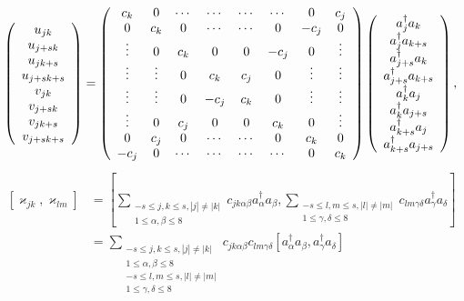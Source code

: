 \documentclass[aps,preprint]{revtex4}%
\begin{document}
\begin{equation}
\left(
\begin{array}
[c]{c}%
u_{jk}\\
u_{j+sk}\\
u_{jk+s}\\
u_{j+sk+s}\\
v_{jk}\\
v_{j+sk}\\
v_{jk+s}\\
v_{j+sk+s}%
\end{array}
\right)  =\left(
\begin{array}
[c]{cccccccc}%
c_{k} & 0 & \cdots & \cdots & \cdots & \cdots & 0 & c_{j}\\
0 & c_{k} & 0 & \cdots & \cdots & 0 & -c_{j} & 0\\
\vdots & 0 & c_{k} & 0 & 0 & -c_{j} & 0 & \vdots\\
\vdots & \vdots & 0 & c_{k} & c_{j} & 0 & \vdots & \vdots\\
\vdots & \vdots & 0 & -c_{j} & c_{k} & 0 & \vdots & \vdots\\
\vdots & 0 & c_{j} & 0 & 0 & c_{k} & 0 & \vdots\\
0 & c_{j} & 0 & \cdots & \cdots & 0 & c_{k} & 0\\
-c_{j} & 0 & \cdots & \cdots & \cdots & \cdots & 0 & c_{k}%
\end{array}
\right)  \left(
\begin{array}
[c]{c}%
a_{j}^{\dagger}a_{k}\\
a_{j}^{\dagger}a_{k+s}\\
a_{j+s}^{\dagger}a_{k}\\
a_{j+s}^{\dagger}a_{k+s}\\
a_{k}^{\dagger}a_{j}\\
a_{k}^{\dagger}a_{j+s}\\
a_{k+s}^{\dagger}a_{j}\\
a_{k+s}^{\dagger}a_{j+s}%
\end{array}
\right)  ,
\end{equation}%
\begin{align}
\left[  \varkappa_{jk},\varkappa_{lm}\right]   &  =\left[  \sum
_{\substack{-s\leq j,k\leq s,\left\vert j\right\vert \neq\left\vert
k\right\vert \\1\leq\alpha,\beta\leq8}}c_{jk\alpha\beta}a_{\alpha}^{\dagger
}a_{\beta},\sum_{\substack{-s\leq l,m\leq s,\left\vert l\right\vert
\neq\left\vert m\right\vert \\1\leq\gamma,\delta\leq8}}c_{lm\gamma\delta
}a_{\gamma}^{\dagger}a_{\delta}\right] \\
&  =\sum_{\substack{-s\leq j,k\leq s,\left\vert j\right\vert \neq\left\vert
k\right\vert \\1\leq\alpha,\beta\leq8\\-s\leq l,m\leq s,\left\vert
l\right\vert \neq\left\vert m\right\vert \\1\leq\gamma,\delta\leq
8}}c_{jk\alpha\beta}c_{lm\gamma\delta}\left[  a_{\alpha}^{\dagger}a_{\beta
},a_{\gamma}^{\dagger}a_{\delta}\right]
\end{align}
\end{document}
